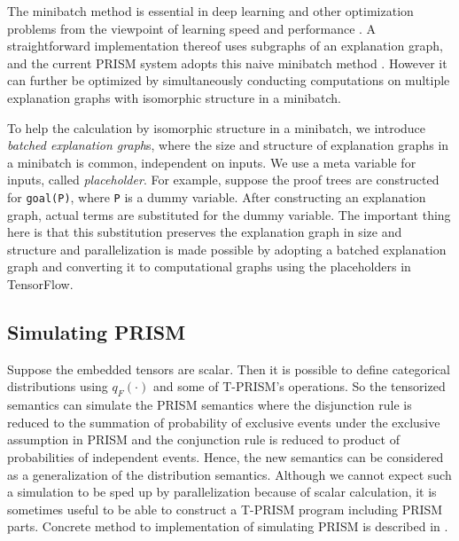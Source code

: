\documentclass[a4paper]{report}
\begin{document}
The  minibatch  method  is  essential   in  deep  learning  and  other
optimization  problems  from  the  viewpoint  of  learning  speed  and
performance    \cite{Goodfellow-et-al-2016}.      A    straightforward
implementation thereof uses subgraphs of an explanation graph, and the
current     PRISM    system     adopts     this    naive     minibatch
method \cite{kojima2018ijar}.  However it  can further be optimized by
simultaneously conducting computations  on multiple explanation graphs
with isomorphic structure in a minibatch.

To help  the calculation  by isomorphic structure  in a  minibatch, we
introduce  {\em  batched explanation  graph\/}s,  where  the size  and
structure of explanation graphs in  a minibatch is common, independent
on  inputs.   We  use  a   meta  variable  for  inputs,   called  {\em
	placeholder}.  For  example, suppose  the proof trees  are constructed
for  {\tt  goal(P)},  where  {\tt  P}  is  a  dummy  variable.   After
constructing an  explanation graph,  actual terms are  substituted for
the dummy variable. The important thing here is that this substitution
preserves   the  explanation   graph   in  size   and  structure   and
parallelization  is made  possible by  adopting a  batched explanation
graph and converting it to computational graphs using the placeholders
in TensorFlow.


\subsection*{Simulating PRISM}

Suppose the embedded tensors are scalar. Then it is possible to define
categorical  distributions using  $q_F(\cdot)$ and  some of  T-PRISM's
operations.   So  the  tensorized  semantics can  simulate  the  PRISM
semantics where  the disjunction rule  is reduced to the  summation of
probability  of exclusive  events  under the  exclusive assumption  in
PRISM \cite{Sato08a} and the conjunction rule is reduced to product of
probabilities of independent events.
Hence, the new semantics can be  considered as a generalization of the
distribution semantics. Although we cannot expect such a simulation to
be sped  up by  parallelization because of  scalar calculation,  it is
sometimes useful to  be able to construct a  T-PRISM program including
PRISM parts.
Concrete method to implementation of simulating PRISM is described in .
\end{document}
